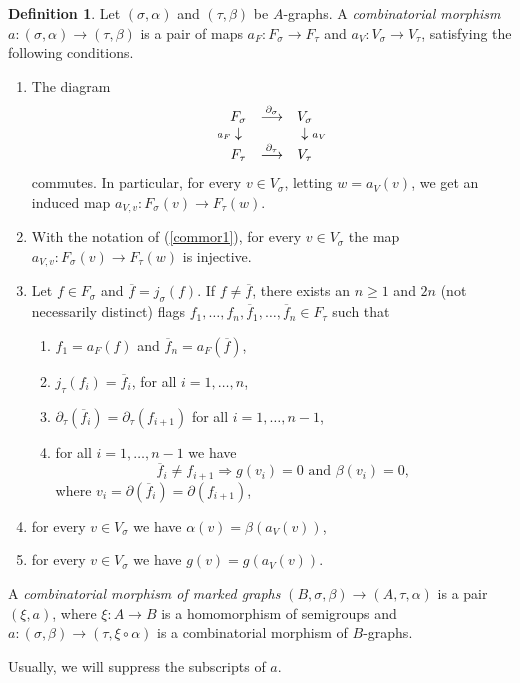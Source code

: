 \documentclass[11pt]{amsart}
\theoremstyle{definition}
\newtheorem{defn}[prop]{Definition}
\theoremstyle{remark}
\newcommand{\del}{\partial}
\newcommand{\comp}{\mathbin{{\scriptstyle\circ}}}
\newcommand{\ol}{\overline}
\newcommand{\ldiag}[1]
       {\makebox[0cm]{\({\scriptstyle#1}\downarrow\phantom{\scriptstyle#1}\)}}
\newcommand{\rdiag}[1]
       {\makebox[0cm]{\(\phantom{\scriptstyle#1}\downarrow{\scriptstyle#1}\)}}
\newcommand{\comdia}[9]{
\begin{array}{ccc}
#1 & \stackrel{#2}{\longrightarrow} & #3 \\
\ldiag{#4} & #5 & \rdiag{#6} \\
#7 & \stackrel{#8}{\longrightarrow} & #9
\end{array}}
\renewcommand{\t}{_{\tau}}
\newcommand{\s}{_{\sigma}}
\theoremstyle{plain}
\theoremstyle{definition}
\theoremstyle{remark}
\begin{document}
\begin{defn} \label{commor}
Let \((\sigma,\alpha)\) and \((\tau,\beta)\) be \(A\)-graphs. A {\em combinatorial
morphism
\(a:(\sigma,\alpha)\rightarrow(\tau,\beta)\)} is a pair of maps
\(a_F:F\s\rightarrow F\t\) and \(a_V:V\s\rightarrow V\t\),
satisfying the following conditions.
\begin{enumerate}
\item \label{commor1} The diagram
\[
\comdia{F\s}{\del\s}{V\s}{a_F}{}{a_V}{F\t}{\del\t}{V\t}
\]
commutes. In particular, for every \(v\in V\s\), letting \(w=a_V(v)\), we get an
induced map \(a_{V,v}:F\s(v)\rightarrow
F\t(w)\).
\item With the notation of (\ref{commor1}), for every \(v\in V\s\) the map
\(a_{V,v}:F\s(v)\rightarrow F\t(w)\) is
injective.
\item \label{commor3} Let \(f\in F\s\) and \(\ol{f}=j\s(f)\). If \(f\not=\ol{f}\),
there exists an \(n\geq1\) and \(2n\) (not
necessarily distinct) flags \(f_1,\ldots,f_n,\ol{f}_1,\ldots,\ol{f}_n\in F\t\)
such that
\begin{enumerate}
\item \(f_1=a_F(f)\) and \(\ol{f}_n=a_F(\ol{f})\),
\item \(j\t(f_i)=\ol{f}_i\), for all \(i=1,\ldots,n\),
\item \(\del\t(\ol{f}_i)=\del\t(f_{i+1})\) for all \(i=1,\ldots,n-1\),
\item for all \(i=1,\ldots,n-1\) we have
\[
\ol{f}_i\not= f_{i+1}\Longrightarrow\text{\(g({v_i})=0\) and \(\beta(v_i)=0\)},
\]
where \(v_i=\del(\ol{f}_i)=\del(f_{i+1})\),
\end{enumerate}
\item for every \(v\in V\s\) we have \(\alpha(v)=\beta(a_V(v))\),
\item for every \(v\in V\s\) we have \(g({v})=g({a_V(v)})\).
\end{enumerate}

A {\em combinatorial morphism of marked graphs
}\((B,\sigma,\beta)\rightarrow(A,\tau,\alpha)\) is a pair \((\xi,a)\), where
\(\xi:A\rightarrow B\) is a homomorphism of semigroups and
\(a:(\sigma,\beta)\rightarrow(\tau,\xi\comp\alpha)\) is a
combinatorial morphism of \(B\)-graphs.

Usually, we will suppress the subscripts of \(a\).
\end{defn}
\end{document}
